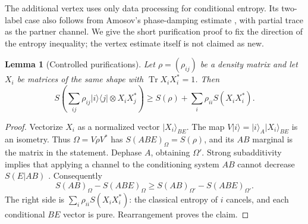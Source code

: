 \documentclass[11pt]{article}
\newtheorem{lemma}[theorem]{Lemma}
\newcommand{\Tr}{\operatorname{Tr}}
\begin{document}
The additional vertex uses only data processing for conditional entropy. Its two-label case also follows from Amosov's phase-damping estimate \cite[Proposition 5]{amosov}, with partial trace as the partner channel. We give the short purification proof to fix the direction of the entropy inequality; the vertex estimate itself is not claimed as new.
\begin{lemma}[Controlled purifications]\label{lem:controlled}
Let $\rho=(\rho_{ij})$ be a density matrix and let $X_i$ be matrices of the same shape with $\Tr X_iX_i^*=1$. Then
\[
 S\left(\sum_{ij}\rho_{ij}|i\rangle\langle j|\otimes X_iX_j^*\right)
 \ge S(\rho)+\sum_i\rho_{ii}S(X_iX_i^*).
\]
\end{lemma}
\begin{proof}
Vectorize $X_i$ as a normalized vector $|X_i\rangle_{BE}$. The map
$V|i\rangle=|i\rangle_A|X_i\rangle_{BE}$ is an isometry. Thus
$\Omega=V\rho V^*$ has $S(ABE)_\Omega=S(\rho)$, and its $AB$ marginal is the matrix in the statement. Dephase $A$, obtaining $\Omega'$. Strong subadditivity implies that applying a channel to the conditioning system $AB$ cannot decrease $S(E|AB)$ \cite{ssa}. Consequently
\[
 S(AB)_\Omega-S(ABE)_\Omega
 \ge S(AB)_{\Omega'}-S(ABE)_{\Omega'}.
\]
The right side is $\sum_i\rho_{ii}S(X_iX_i^*)$: the classical entropy of $i$ cancels, and each conditional $BE$ vector is pure. Rearrangement proves the claim.
\end{proof}
\end{document}
